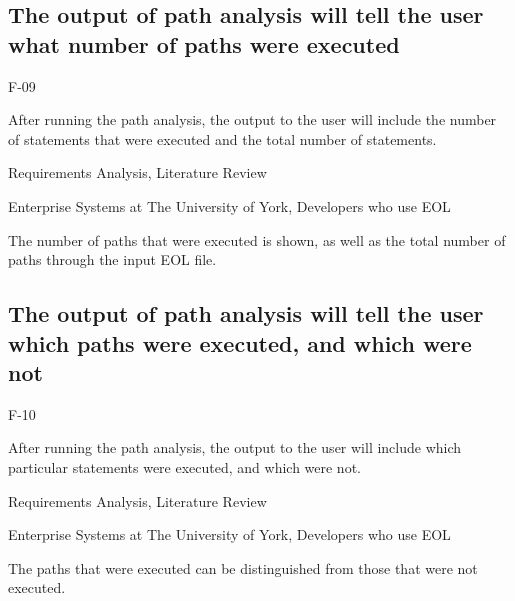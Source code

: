 \subsection{The output of path analysis will tell the user what number of paths were executed}
\begin{description}[style=sameline,leftmargin=4.5cm,nolistsep]
\item[\hspace*{0.3cm}Label] F-09
\item[\hspace*{0.3cm}Description] After running the path analysis, the output to the user will include the number of statements that were executed and the total number of statements.
\item[\hspace*{0.3cm}Source] Requirements Analysis, Literature Review
\item[\hspace*{0.3cm}Stakeholders] Enterprise Systems at The University of York, Developers who use EOL
\item[\hspace*{0.3cm}Satisfiable Conditions] The number of paths that were executed is shown, as well as the total number of paths through the input EOL file.
\end{description}

\subsection{The output of path analysis will tell the user which paths were executed, and which were not}
\begin{description}[style=sameline,leftmargin=4.5cm,nolistsep]
\item[\hspace*{0.3cm}Label] F-10
\item[\hspace*{0.3cm}Description] After running the path analysis, the output to the user will include which particular statements were executed, and which were not.
\item[\hspace*{0.3cm}Source] Requirements Analysis, Literature Review
\item[\hspace*{0.3cm}Stakeholders] Enterprise Systems at The University of York, Developers who use EOL
\item[\hspace*{0.3cm}Satisfiable Conditions] The paths that were executed can be distinguished from those that were not executed.
\end{description}

